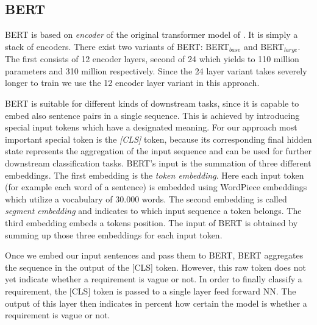 \subsection{BERT}
\label{chp:approach:sec:models:subsec:BERT}

\Ac{BERT} is based on \textit{encoder} of the original transformer model of \textcite{Vaswani:2017}.
It is simply a stack of encoders.
There exist two variants of \ac{BERT}: \ac{BERT}$_{base}$ and \ac{BERT}$_{large}$.
The first consists of 12 encoder layers, second of 24 which yields to 110 million parameters and 310 million respectively.
Since the 24 layer variant takes severely longer to train we use the 12 encoder layer variant in this approach. \parencite{Devlin:2018}

\Ac{BERT} is suitable for different kinds of downstream tasks, since it is capable to embed also sentence pairs in a single sequence.
This is achieved by introducing special input tokens which have a designated meaning.
For our approach most important special token is the \textit{[CLS]} token, because its corresponding final hidden state represents the aggregation of the input sequence and can be used for further downstream classification tasks.
\Ac{BERT}'s input is the summation of three different embeddings.
The first embedding is the \textit{token embedding}.
Here each input token (for example each word of a sentence) is embedded using WordPiece embeddings \parencite{Wu:2016} which utilize a vocabulary of 30.000 words.
The second embedding is called \textit{segment embedding} and indicates to which input sequence a token belongs.
The third embedding embeds a tokens position.
The input of \ac{BERT} is obtained by summing up those three embeddings for each input token.

Once we embed our input sentences and pass them to \ac{BERT}, \ac{BERT} aggregates the sequence in the output of the [CLS] token.
However, this raw token does not yet indicate whether a requirement is vague or not.
In order to finally classify a requirement, the [CLS] token is passed to a single layer feed forward \ac{NN}.
The output of this layer then indicates in percent how certain the model is whether a requirement is vague or not.
